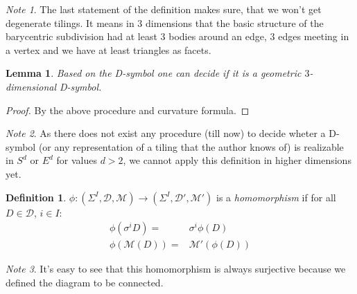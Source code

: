 \documentclass[12pt,a4paper]{article}
\theoremstyle{plain}%
\newtheorem{lem}[thm]{Lemma}
\theoremstyle{definition}
\newtheorem{defn}{Definition}[section]
\theoremstyle{remark}
\newtheorem*{note}{Note}
\begin{document}
\begin{note}
  The last statement of the definition makes sure, that we won't get degenerate
  tilings. It means in $3$ dimensions that the basic structure of the barycentric
  subdivision had at least 3 bodies around an edge, 3 edges meeting in a
  vertex and we have at least triangles as facets.
\end{note}

\begin{lem}
  Based on the D-symbol one can decide if it is a geometric $3$-dimensional
  D-symbol.
\end{lem}

\begin{proof}
  By the above procedure and curvature formula.

%
\end{proof}

\begin{note}
  As there does not exist any procedure (till now) to decide wheter a D-symbol
  (or any representation of a tiling that the author knows of) is realizable in
  $S^d$ or $E^d$ for values $d>2$, we cannot apply this definition in higher
  dimensions yet.
\end{note}

\begin{defn}
  $\phi: (\Sigma^I,\mathcal{D},\mathcal{M}) \rightarrow
  (\Sigma^I,\mathcal{D}',\mathcal{M}')$ is a {\em homomorphism} if for all $D\in
  \mathcal{D}$, $i \in I$:
  \begin{align}
    \phi(\sigma^iD)= & \sigma^i\phi(D) \\
    \phi(\mathcal{M}(D))= & \mathcal{M}'(\phi(D))
  \end{align}
\end{defn}

\begin{note}
  It's easy to see that this homomorphism is always surjective because we
  defined the diagram to be connected.
\end{note}
\end{document}
